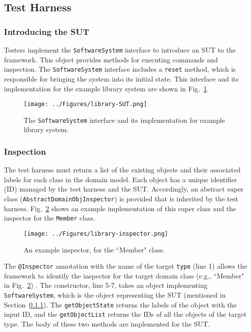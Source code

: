 \subsection{Test Harness}
\label{sec:create-test model-test-harness}

\subsubsection{Introducing the SUT}
\label{sec:test-harness-intro-SUT}
Testers implement the \texttt{SoftwareSystem} interface to introduce an SUT to the framework.
This object provides methods for executing commands and inspection. The \texttt{SoftwareSystem} interface includes a \texttt{reset} method, which is responsible for bringing the system into its initial state. This interface and its implementation for the example library system are shown in Fig.~\ref{fig:library-SUT}.

\begin{figure}[h]
\centering
\texttt{[image: ../Figures/library-SUT.png]}
\caption{The \texttt{SoftwareSystem} interface and its implementation for example library system.}
\label{fig:library-SUT}
\end{figure}


\subsubsection{Inspection}
\label{sec:test-harness-inspection}
The test harness must return a list of the existing objects and their associated labels for each class in the domain model. Each object has a unique identifier (ID) managed by the test harness and the SUT. Accordingly, an abstract super class (\texttt{AbstractDomainObjInspector})  is provided that is inherited by the test harness. Fig.~\ref{fig:library-inspector} shows an example implementation of this super class and the inspector for the \texttt{Member} class.

\begin{figure}[h]
\centering
\texttt{[image: ../Figures/library-inspector.png]}
\caption{An example inspector, for the ``Member" class.}
\label{fig:library-inspector}
\end{figure}

The \texttt{@Inspector} annotation with the name of the target \texttt{type} (line 1) allows the framework to identify the inspector for the target domain class (e.g., ``Member" in Fig.~\ref{fig:library-inspector}) . The constructor, line 5-7, takes an object implementing \texttt{SoftwareSystem}, which is the object representing the SUT (mentioned in Section~\ref{sec:test-harness-intro-SUT}). The \texttt{getObjectState} returns the labels of the object with the input ID, and the \texttt{getObjectList} returns the IDs of all the objects of the target type. The body of these two methods are implemented for the SUT.

